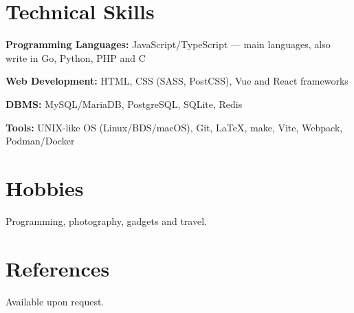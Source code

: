 \documentclass[10pt]{article}
\begin{document}

\section{Technical Skills}

\begin{compactitemize}
	\item \textbf{Programming Languages:} JavaScript/TypeScript --- main languages, also write in Go, Python, PHP and C
	\item \textbf{Web Development:} HTML, CSS (SASS, PostCSS), Vue and React frameworks
	\item \textbf{DBMS:} MySQL/MariaDB, PostgreSQL, SQLite, Redis
	\item \textbf{Tools:} UNIX-like OS (Linux/BDS/macOS), Git, \LaTeX, make, Vite, Webpack, Podman/Docker
\end{compactitemize}


\section{Hobbies}

Programming, photography, gadgets and travel.


\section{References}

Available upon request.


\end{document}
